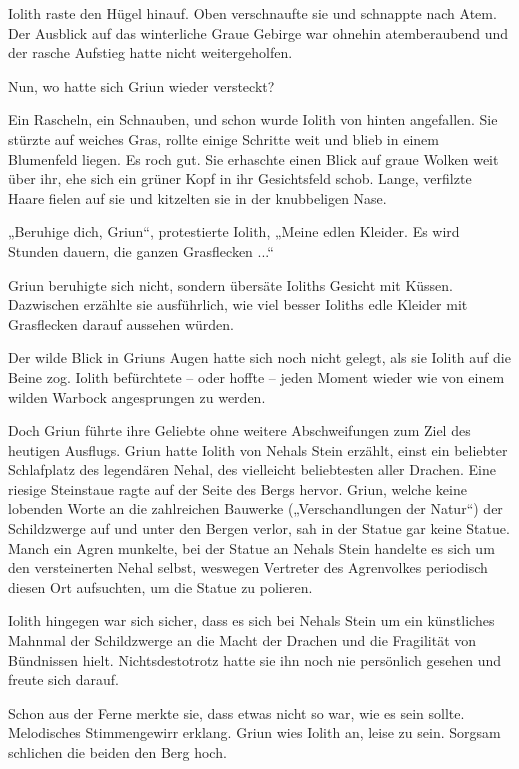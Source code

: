 Iolith raste den Hügel hinauf. Oben verschnaufte sie und schnappte nach Atem. Der Ausblick auf das winterliche Graue Gebirge war ohnehin atemberaubend und der rasche Aufstieg hatte nicht weitergeholfen.

Nun, wo hatte sich Griun wieder versteckt?

Ein Rascheln, ein Schnauben, und schon wurde Iolith von hinten angefallen. Sie stürzte auf weiches Gras, rollte einige Schritte weit und blieb in einem Blumenfeld liegen. Es roch gut. Sie erhaschte einen Blick auf graue Wolken weit über ihr, ehe sich ein grüner Kopf in ihr Gesichtsfeld schob. Lange, verfilzte Haare fielen auf sie und kitzelten sie in der knubbeligen Nase.

„Beruhige dich, Griun“, protestierte Iolith, „Meine edlen Kleider. Es wird Stunden dauern, die ganzen Grasflecken ...“

Griun beruhigte sich nicht, sondern übersäte Ioliths Gesicht mit Küssen. Dazwischen erzählte sie ausführlich, wie viel besser Ioliths edle Kleider mit Grasflecken darauf aussehen würden.

Der wilde Blick in Griuns Augen hatte sich noch nicht gelegt, als sie Iolith auf die Beine zog. Iolith befürchtete – oder hoffte – jeden Moment wieder wie von einem wilden Warbock angesprungen zu werden.

Doch Griun führte ihre Geliebte ohne weitere Abschweifungen zum Ziel des heutigen Ausflugs. Griun hatte Iolith von Nehals Stein erzählt, einst ein beliebter Schlafplatz des legendären Nehal, des vielleicht beliebtesten aller Drachen. Eine riesige Steinstaue ragte auf der Seite des Bergs hervor. Griun, welche keine lobenden Worte an die zahlreichen Bauwerke („Verschandlungen der Natur“) der Schildzwerge auf und unter den Bergen verlor, sah in der Statue gar keine Statue. Manch ein Agren munkelte, bei der Statue an Nehals Stein handelte es sich um den versteinerten Nehal selbst, weswegen Vertreter des Agrenvolkes periodisch diesen Ort aufsuchten, um die Statue zu polieren.

Iolith hingegen war sich sicher, dass es sich bei Nehals Stein um ein künstliches Mahnmal der Schildzwerge an die Macht der Drachen und die Fragilität von Bündnissen hielt. Nichtsdestotrotz hatte sie ihn noch nie persönlich gesehen und freute sich darauf.

Schon aus der Ferne merkte sie, dass etwas nicht so war, wie es sein sollte. Melodisches Stimmengewirr erklang. Griun wies Iolith an, leise zu sein. Sorgsam schlichen die beiden den Berg hoch.

